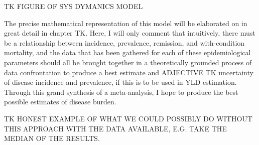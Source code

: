 TK FIGURE OF SYS DYMANICS MODEL

The precise mathematical representation of this model will be
elaborated on in great detail in chapter TK. Here, I will only comment
that intuitively, there must be a relationship between incidence,
prevalence, remission, and with-condition mortality, and the data that
has been gathered for each of these epidemiological parameters should
all be brought together in a theoretically grounded process of data
confrontation to produce a best estimate and ADJECTIVE TK uncertainty
of disease incidence and prevalence, if this is to be used in YLD
estimation. Through this grand synthesis of a meta-analysis, I hope to
produce the best possible estimates of disease burden.

TK HONEST EXAMPLE OF WHAT WE COULD POSSIBLY DO WITHOUT THIS APPROACH
WITH THE DATA AVAILABLE, E.G. TAKE THE MEDIAN OF THE RESULTS.

